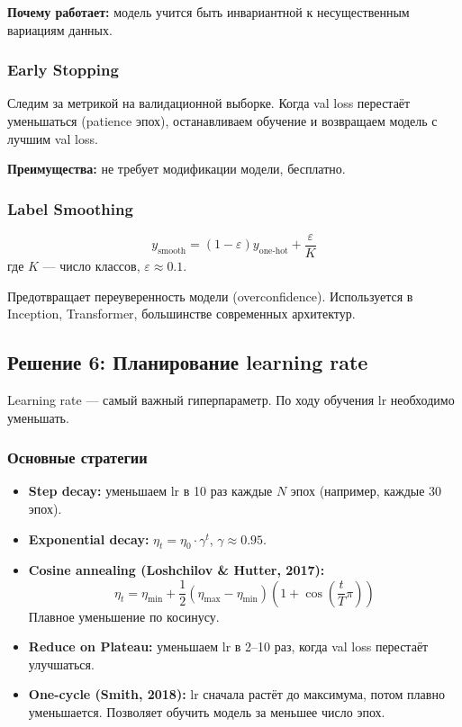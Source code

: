 \documentclass[a4paper,12pt]{article}
\begin{document}
\textbf{Почему работает:} модель учится быть инвариантной к несущественным вариациям данных.

\subsubsection{Early Stopping}
Следим за метрикой на валидационной выборке. Когда val loss перестаёт уменьшаться (patience эпох), останавливаем обучение и возвращаем модель с лучшим val loss.

\textbf{Преимущества:} не требует модификации модели, бесплатно.

\subsubsection{Label Smoothing}
\[
y_{\text{smooth}} = (1-\varepsilon) y_{\text{one-hot}} + \frac{\varepsilon}{K}
\]
где $K$ — число классов, $\varepsilon \approx 0.1$.

Предотвращает переуверенность модели (overconfidence). Используется в Inception, Transformer, большинстве современных архитектур.

\subsection{Решение 6: Планирование learning rate}

Learning rate — самый важный гиперпараметр. По ходу обучения lr необходимо уменьшать.

\subsubsection{Основные стратегии}
\begin{itemize}
    \item \textbf{Step decay:} уменьшаем lr в 10 раз каждые $N$ эпох (например, каждые 30 эпох).
    \item \textbf{Exponential decay:} $\eta_t = \eta_0 \cdot \gamma^t$, $\gamma \approx 0.95$.
    \item \textbf{Cosine annealing (Loshchilov \& Hutter, 2017):}
    \[
    \eta_t = \eta_{\min} + \frac{1}{2}(\eta_{\max} - \eta_{\min})\left(1 + \cos\left(\frac{t}{T}\pi\right)\right)
    \]
    Плавное уменьшение по косинусу.
    \item \textbf{Reduce on Plateau:} уменьшаем lr в 2--10 раз, когда val loss перестаёт улучшаться.
    \item \textbf{One-cycle (Smith, 2018):} lr сначала растёт до максимума, потом плавно уменьшается. Позволяет обучить модель за меньшее число эпох.
\end{itemize}
\end{document}
